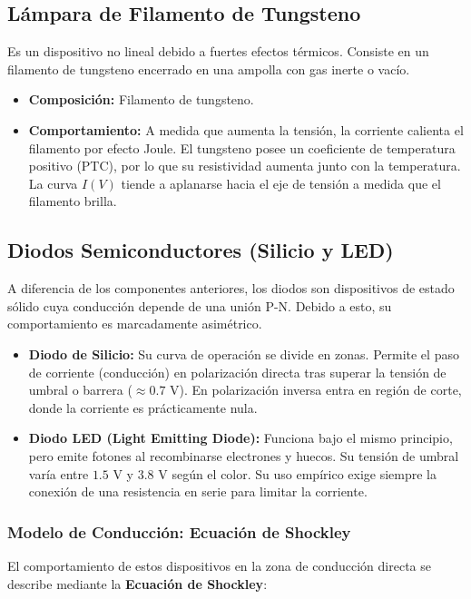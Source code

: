 \vspace{\fill}

\pagebreak

\subsection{Lámpara de Filamento de Tungsteno}
Es un dispositivo no lineal debido a fuertes efectos térmicos. Consiste en un filamento de tungsteno encerrado en una ampolla con gas inerte o vacío.
\begin{itemize}
    \item \textbf{Composición:} Filamento de tungsteno.
    \item \textbf{Comportamiento:} A medida que aumenta la tensión, la corriente calienta el filamento por efecto Joule. El tungsteno posee un coeficiente de temperatura positivo (PTC), por lo que su resistividad aumenta junto con la temperatura. La curva $I(V)$ tiende a aplanarse hacia el eje de tensión a medida que el filamento brilla.
\end{itemize}

\vspace{0.5cm}

\subsection{Diodos Semiconductores (Silicio y LED)}
A diferencia de los componentes anteriores, los diodos son dispositivos de estado sólido cuya conducción depende de una unión P-N. Debido a esto, su comportamiento es marcadamente asimétrico.

\begin{itemize}
    \item \textbf{Diodo de Silicio:} Su curva de operación se divide en zonas. Permite el paso de corriente (conducción) en polarización directa tras superar la tensión de umbral o barrera ($\approx 0.7$ V). En polarización inversa entra en región de corte, donde la corriente es prácticamente nula.
    \item \textbf{Diodo LED (Light Emitting Diode):} Funciona bajo el mismo principio, pero emite fotones al recombinarse electrones y huecos. Su tensión de umbral varía entre $1.5$ V y $3.8$ V según el color. Su uso empírico exige siempre la conexión de una resistencia en serie para limitar la corriente.
\end{itemize}

\subsubsection{Modelo de Conducción: Ecuación de Shockley}
El comportamiento de estos dispositivos en la zona de conducción directa se describe mediante la \textbf{Ecuación de Shockley}:

